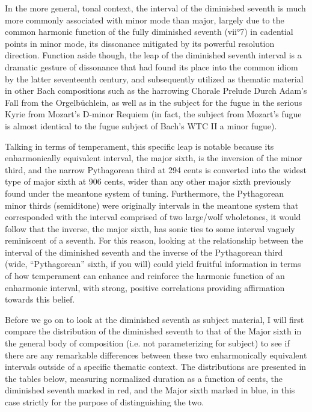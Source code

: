 In the more general, tonal context, the interval of the diminished
seventh is much more commonly associated with minor mode than major,
largely due to the common harmonic function of the fully diminished
seventh (vii°7) in cadential points in minor mode, its dissonance
mitigated by its powerful resolution direction. Function aside though,
the leap of the diminished seventh interval is a dramatic gesture of
dissonance that had found its place into the common idiom by the latter
seventeenth century, and subsequently utilized as thematic material in
other Bach compositions such as the harrowing Chorale Prelude Durch
Adam's Fall from the Orgelbüchlein, as well as in the subject for the
fugue in the serious Kyrie from Mozart's D-minor Requiem (in fact, the
subject from Mozart's fugue is almost identical to the fugue subject of
Bach's WTC II a minor fugue).

Talking in terms of temperament, this specific leap is notable because
its enharmonically equivalent interval, the major sixth, is the
inversion of the minor third, and the narrow Pythagorean third at 294
cents is converted into the widest type of major sixth at 906 cents,
wider than any other major sixth previously found under the meantone
system of tuning. Furthermore, the Pythagorean minor thirds (semiditone)
were originally intervals in the meantone system that corresponded with
the interval comprised of two large/wolf wholetones, it would follow
that the inverse, the major sixth, has sonic ties to some interval
vaguely reminiscent of a seventh. For this reason, looking at the
relationship between the interval of the diminished seventh and the
inverse of the Pythagorean third (wide, ``Pythagorean'' sixth, if you
will) could yield fruitful information in terms of how temperament can
enhance and reinforce the harmonic function of an enharmonic interval,
with strong, positive correlations providing affirmation towards this
belief.

Before we go on to look at the diminished seventh as subject material, I
will first compare the distribution of the diminished seventh to that of
the Major sixth in the general body of composition (i.e. not
parameterizing for subject) to see if there are any remarkable
differences between these two enharmonically equivalent intervals
outside of a specific thematic context. The distributions are presented
in the tables below, measuring normalized duration as a function of
cents, the diminished seventh marked in red, and the Major sixth marked
in blue, in this case strictly for the purpose of distinguishing the
two.


